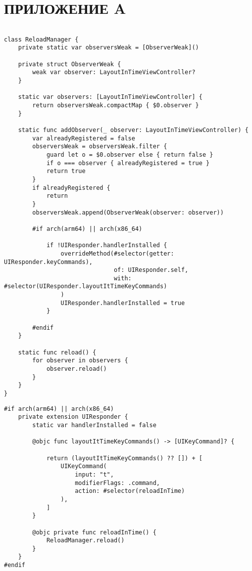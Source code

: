 \section*{ПРИЛОЖЕНИЕ A}

\begin{lstlisting}[caption={Класс, обеспечивающий перезагрузку во время выполнения}]

class ReloadManager {
    private static var observersWeak = [ObserverWeak]()

    private struct ObserverWeak {
        weak var observer: LayoutInTimeViewController?
    }

    static var observers: [LayoutInTimeViewController] {
        return observersWeak.compactMap { $0.observer }
    }

    static func addObserver(_ observer: LayoutInTimeViewController) {
        var alreadyRegistered = false
        observersWeak = observersWeak.filter {
            guard let o = $0.observer else { return false }
            if o === observer { alreadyRegistered = true }
            return true
        }
        if alreadyRegistered {
            return
        }
        observersWeak.append(ObserverWeak(observer: observer))

        #if arch(arm64) || arch(x86_64)

            if !UIResponder.handlerInstalled {
                overrideMethod(#selector(getter: UIResponder.keyCommands),
                               of: UIResponder.self,
                               with: #selector(UIResponder.layoutItTimeKeyCommands)
                )
                UIResponder.handlerInstalled = true
            }

        #endif
    }

    static func reload() {
        for observer in observers {
            observer.reload()
        }
    }
}
\end{lstlisting}

\begin{lstlisting}[caption={Функция определения списка событий, по свершению которых происходит перезагрузка}]
#if arch(arm64) || arch(x86_64)
    private extension UIResponder {
        static var handlerInstalled = false

        @objc func layoutItTimeKeyCommands() -> [UIKeyCommand]? {

            return (layoutItTimeKeyCommands() ?? []) + [
                UIKeyCommand(
                    input: "t",
                    modifierFlags: .command,
                    action: #selector(reloadInTime)
                ),
            ]
        }

        @objc private func reloadInTime() {
            ReloadManager.reload()
        }
    }
#endif
\end{lstlisting}

